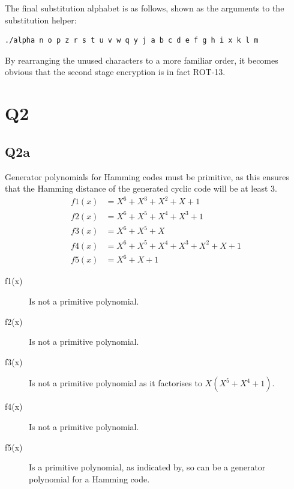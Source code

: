 \documentclass[pdflatex, a4paper,12pt]{article}
\begin{document}
\begin{quote}
    
\end{quote}

The final substitution alphabet is as follows, shown as the arguments to the
substitution helper:

\begin{verbatim}
./alpha n o p z r s t u v w q y j a b c d e f g h i x k l m
\end{verbatim}
By rearranging the unused characters to a more familiar order, it becomes
obvious that the second stage encryption is in fact ROT-13.

\section{Q2}

\subsection{Q2a}

Generator polynomials for Hamming codes must be primitive, as this ensures that
the Hamming distance of the generated cyclic code will be at least 3. 
\begin{align*}
f1(x) & = X^6 + X^3 + X^2 + X + 1\\
f2(x) & = X^6 + X^5 + X^4 + X^3 + 1\\
f3(x) & = X^6 + X^5 + X\\
f4(x) & = X^6 + X^5 + X^4 + X^3 + X^2 + X + 1\\
f5(x) & = X^6 + X + 1
\end{align*}

\begin{description}
    \item[f1(x)] Is not a primitive polynomial. 
    \item[f2(x)] Is not a primitive polynomial.
    \item[f3(x)] Is not a primitive polynomial as it factorises to $X(X^5 + X^4
        + 1)$.
    \item[f4(x)] Is not a primitive polynomial.
    \item[f5(x)] Is a primitive polynomial, as indicated
        by\cite{hansen_primitive_1992}, so can be a generator polynomial for a
        Hamming code.
\end{description}
\end{document}
